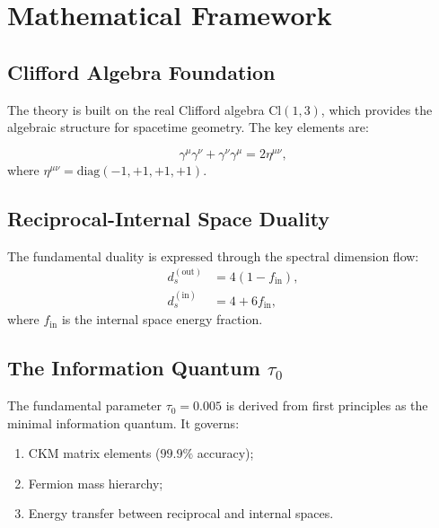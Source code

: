\documentclass[aps,prd,reprint,superscriptaddress,amsmath,amssymb]{revtex4-2}
\newcommand{\Cl}{\mathrm{Cl}}
\newcommand{\diag}{\mathrm{diag}}
\begin{document}
\section{Mathematical Framework}
\label{sec:framework}

\subsection{Clifford Algebra Foundation}

The theory is built on the real Clifford algebra $\Cl(1,3)$, which provides the algebraic structure for spacetime geometry. The key elements are:

\begin{equation}
    \gamma^\mu \gamma^\nu + \gamma^\nu \gamma^\mu = 2\eta^{\mu\nu},
\end{equation}
where $\eta^{\mu\nu} = \diag(-1, +1, +1, +1)$.

\subsection{Reciprocal-Internal Space Duality}

The fundamental duality is expressed through the spectral dimension flow:
\begin{align}
    d_s^{(\text{out})} &= 4(1 - f_{\text{in}}), \\
    d_s^{(\text{in})} &= 4 + 6f_{\text{in}},
\end{align}
where $f_{\text{in}}$ is the internal space energy fraction.

\subsection{The Information Quantum $\tau_0$}

The fundamental parameter $\tau_0 = 0.005$ is derived from first principles as the minimal information quantum. It governs:
\begin{enumerate}
    \item CKM matrix elements ($99.9\%$ accuracy);
    \item Fermion mass hierarchy;
    \item Energy transfer between reciprocal and internal spaces.
\end{enumerate}

\end{document}

